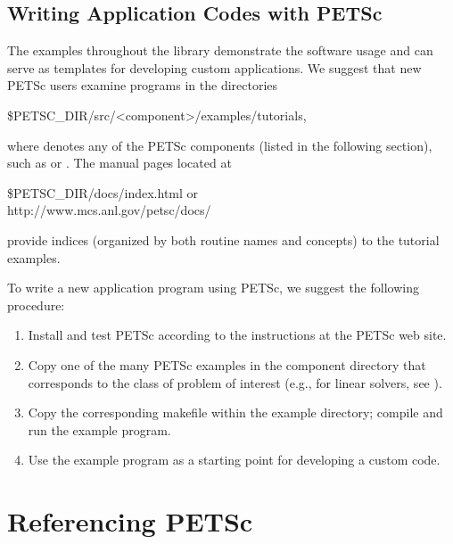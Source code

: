 \subsection*{Writing Application Codes with PETSc}

The examples throughout the library demonstrate the software usage
and can serve as templates for developing
custom applications.  We suggest that new PETSc
users examine programs in the directories 
\begin{tabbing}
  \${PETSC\_DIR}/src/<component>/examples/tutorials,
\end{tabbing}
where 
denotes any of the PETSc components (listed in the following
section), such as  or .  
The manual pages located at
\begin{tabbing}
   \${PETSC\_DIR}/docs/index.html or \\
   http://www.mcs.anl.gov/petsc/docs/
\end{tabbing}
provide indices (organized by both routine names and concepts) to the tutorial examples.

To write a new application program using PETSc, we suggest the
following procedure:
\begin{enumerate}
\item Install and test PETSc according to the instructions at the PETSc web site.
\item Copy one of the many PETSc examples in the component directory
      that corresponds to the class of problem of interest (e.g.,
      for linear solvers, see ).
\item Copy the corresponding makefile within the example directory;
      compile and run the example program.
\item Use the example program as a starting point for developing a custom code.
\end{enumerate}


\section{Referencing PETSc}


